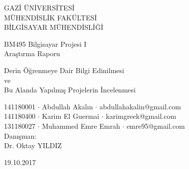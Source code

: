 \renewcommand{\abstractname}{Özet}
\begin{titlepage}
    \begin{center}
        \begin{large}
            \vspace*{0.5cm}
            GAZİ ÜNİVERSİTESİ \\
            MÜHENDİSLİK FAKÜLTESİ \\
            BİLGİSAYAR MÜHENDİSLİĞİ

            \vfill
            BM495 Bilgisayar Projesi I \\
            Araştırma Raporu

            \vfill
            Derin Öğrenmeye Dair Bilgi Edinilmesi \\
            ve \\
            Bu Alanda Yapılmış Projelerin İncelenmesi

            \vfill
        
            \vfill
            141180001 $\cdot$ Abdullah Akalın $\cdot$ abdullahakalin@gmail.com \\
            141180400 $\cdot$ Karim El Guermai $\cdot$ karimgreek@gmail.com \\
            131180027 $\cdot$ Muhammed Emre Emrah $\cdot$ emre95@gmail.com \\

            \vfill
            Danışman: \\
            Dr. Oktay YILDIZ

            \vfill
            \vspace{0.5cm}
            19.10.2017
        \end{large}
    \end{center}
\end{titlepage}
